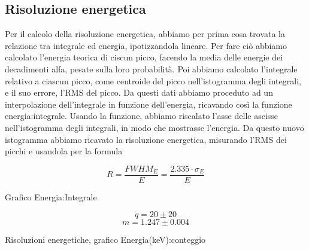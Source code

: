 \subsection{Risoluzione energetica}
\FloatBarrier
Per il calcolo della risoluzione energetica, abbiamo per prima cosa trovata la relazione tra integrale ed energia, ipotizzandola lineare. 
Per fare ciò abbiamo calcolato l'energia teorica di ciscun picco, facendo la media delle energie dei decadimenti alfa, pesate sulla loro probabilità. 
Poi abbiamo calcolato l'integrale relativo a ciascun picco, come centroide del picco nell'istogramma degli integrali, e il suo errore, l'RMS del picco.
Da questi dati abbiamo proceduto ad un interpolazione dell'integrale in funzione dell'energia, ricavando così la funzione energia:integrale. 
Usando la funzione, abbiamo riscalato l'asse delle ascisse nell'istogramma degli integrali, in modo che mostrasse l'energia. 
Da questo nuovo istogramma abbiamo ricavato la risoluzione energetica, misurando l'RMS dei picchi e usandola per la formula

\begin{equation}
 R=\frac{FWHM_E}{E}=\frac{2.335\cdot\sigma_E}{E}
\end{equation}

\begin{grafico}[H]
 \centering
 \resizebox{\textwidth}{!}{%
 
 }%
 \caption{Grafico Energia:Integrale} 
 \label{gr:energy_integral.tex} 
\end{grafico}

\FloatBarrier
$$q=20\pm20$$
$$m=1.247\pm0.004$$


\begin{grafico}
 \centering
 \caption{Risoluzioni energetiche, grafico Energia(keV):conteggio} 
 \label{gr:600_energy.tex} 
\end{grafico}

\FloatBarrier
